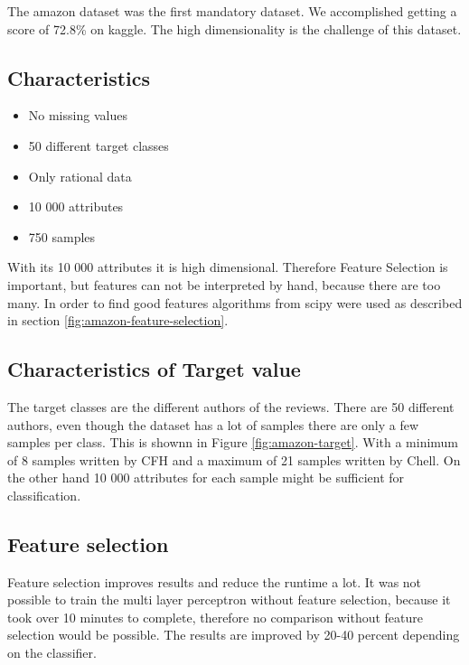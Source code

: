 The amazon dataset was the first mandatory dataset. We accomplished getting a score of 72.8\% on kaggle. The high dimensionality is the challenge of this dataset.

\subsection{Characteristics}

\begin{itemize}
\item No missing values
\item 50 different target classes
\item Only rational data
\item 10 000 attributes
\item 750 samples
\end{itemize}

With its 10 000 attributes it is high dimensional.
Therefore Feature Selection is important, but features can not be interpreted by hand, because there are too many.
In order to find good features algorithms from scipy were used as described in section \ref{fig:amazon-feature-selection}.

\subsection{Characteristics of Target value}
The target classes are the different authors of the reviews.
 There are 50 different authors, even though the dataset has a lot of samples there are only a few samples per class.
This is shownn in Figure \ref{fig:amazon-target}. With a minimum of 8 samples written by CFH and a maximum of 21 samples written by Chell. 
On the other hand 10 000 attributes for each sample might be sufficient for classification.




\subsection{Feature selection}
\label{amazon-feature-selection}
Feature selection improves results and reduce the runtime a lot. It was not possible to train the multi layer perceptron without feature selection, because it took over 10 minutes to complete, therefore no comparison without feature selection would be possible. The results are improved by 20-40 percent depending on the classifier. 

